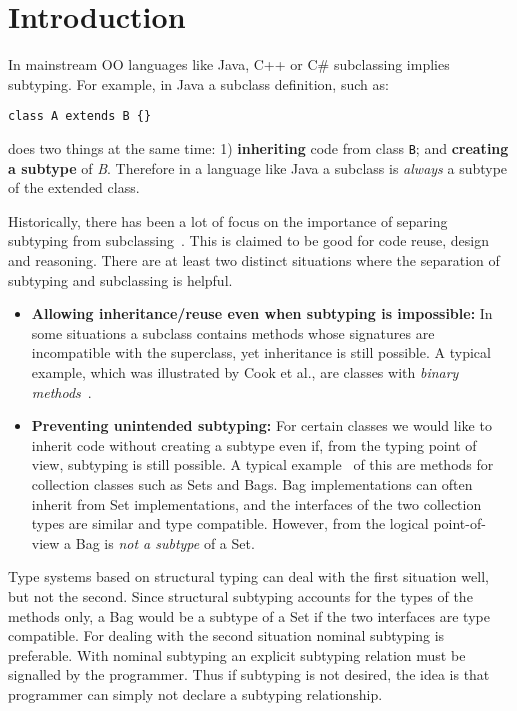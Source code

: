 \section{Introduction}

In mainstream OO languages like Java, C++ or C\# subclassing 
implies subtyping. For example, in Java a subclass definition, such as:

\begin{lstlisting}
class A extends B {}
\end{lstlisting}

\noindent does two things at the same time:
1) {\bf inheriting} code from class \lstinline{B}; and {\bf creating 
a subtype} of \emph{B}. Therefore in a language like Java 
a subclass is \emph{always} a subtype of the extended class.

Historically, there has been a lot of focus on the importance of
separing subtyping from subclassing~\cite{cook}.  This is claimed to be
good for code reuse, design and reasoning. There are at
least two distinct situations where the separation of subtyping and 
subclassing is helpful.

\begin{itemize}

\item {\bf Allowing inheritance/reuse even when subtyping is impossible:} 
In some situations a subclass contains methods whose signatures 
are incompatible with the superclass, yet inheritance is still
possible. A typical example, which was illustrated by Cook et al., are 
classes with \emph{binary methods}~\cite{}.

\item {\bf Preventing unintended subtyping:} For certain classes we
  would like to inherit code without creating a subtype even if, from
  the typing point of view, subtyping is still possible. A typical
  example~\cite{} of this are methods for collection classes such as Sets and
  Bags. Bag implementations can often inherit 
  from Set implementations, and the interfaces of the two collection types are
  similar and type compatible. 
  However, from the logical point-of-view a Bag is \emph{not a
    subtype} of a Set. 

\end{itemize}

Type systems based on structural typing can deal with the first
situation well, but not the second. Since structural subtyping
accounts for the types of the methods only, a Bag would be a subtype
of a Set if the two interfaces are type compatible. For dealing with
the second situation nominal subtyping is preferable. With nominal
subtyping an explicit subtyping relation must be signalled by the
programmer. Thus if subtyping is not desired, the idea is that 
programmer can simply not declare a subtyping relationship.

